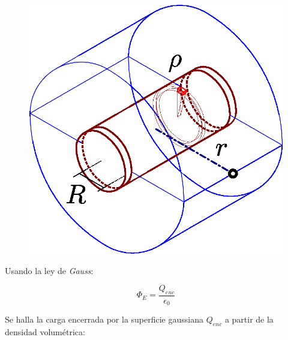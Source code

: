 \documentclass[letter,11pt]{article}
\begin{document}
\begin{enumerate}
\begin{figure}[!h]
\centering
\includegraphics[scale=0.40]{resources/a3.eps}
\end{figure}

Usando la ley de \emph{Gauss}:

\begin{equation*}
    \Phi_E = \frac{Q_{enc}}{\epsilon_0}
\end{equation*}

Se halla la carga encerrada por la superficie gaussiana $Q_{enc}$ a partir
de la densidad volumétrica:


\end{enumerate}
\end{document}
